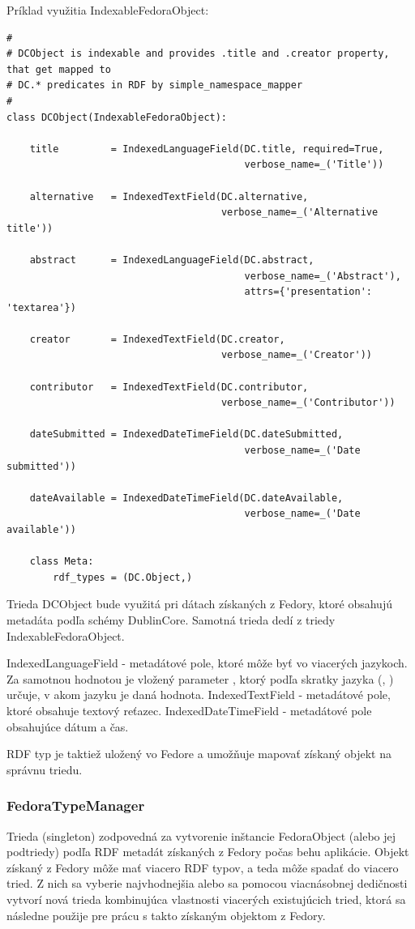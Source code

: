 \documentclass[thesis=M,slovak]{FITthesis}[2013/05/06]
\begin{document}
Príklad využitia IndexableFedoraObject:
\begin{lstlisting}[frame=single] 
#
# DCObject is indexable and provides .title and .creator property, that get mapped to
# DC.* predicates in RDF by simple_namespace_mapper
#
class DCObject(IndexableFedoraObject):

    title         = IndexedLanguageField(DC.title, required=True,
                                         verbose_name=_('Title'))

    alternative   = IndexedTextField(DC.alternative,
                                     verbose_name=_('Alternative title'))

    abstract      = IndexedLanguageField(DC.abstract,
                                         verbose_name=_('Abstract'),
                                         attrs={'presentation': 'textarea'})

    creator       = IndexedTextField(DC.creator,
                                     verbose_name=_('Creator'))

    contributor   = IndexedTextField(DC.contributor,
                                     verbose_name=_('Contributor'))

    dateSubmitted = IndexedDateTimeField(DC.dateSubmitted,
                                         verbose_name=_('Date submitted'))

    dateAvailable = IndexedDateTimeField(DC.dateAvailable,
                                         verbose_name=_('Date available'))

    class Meta:
        rdf_types = (DC.Object,)
\end{lstlisting}

Trieda DCObject bude využitá pri dátach získaných z Fedory, ktoré obsahujú metadáta podľa schémy DublinCore. Samotná trieda dedí z triedy IndexableFedoraObject.

IndexedLanguageField - metadátové pole, ktoré môže byť vo viacerých jazykoch. Za samotnou hodnotou je vložený parameter , ktorý podľa skratky jazyka (, ) určuje, v akom jazyku je daná hodnota.
IndexedTextField - metadátové pole, ktoré obsahuje textový reťazec.
IndexedDateTimeField - metadátové pole obsahujúce dátum a čas.

RDF typ je taktiež uložený vo Fedore a umožňuje mapovať získaný objekt na správnu triedu.

\subsubsection{FedoraTypeManager}
Trieda (singleton) zodpovedná za vytvorenie inštancie FedoraObject (alebo jej podtriedy) podľa RDF metadát získaných z Fedory počas behu aplikácie. Objekt získaný z Fedory môže mať viacero RDF typov, a teda môže spadať do viacero tried. Z nich sa vyberie najvhodnejšia alebo sa pomocou viacnásobnej dedičnosti vytvorí nová trieda kombinujúca vlastnosti viacerých existujúcich tried,  ktorá sa následne použije pre prácu s takto získaným objektom z Fedory.
\end{document}
